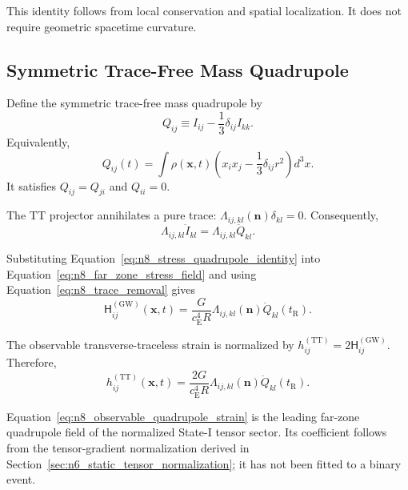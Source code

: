 This identity follows from local conservation and spatial localization. It does not require geometric spacetime curvature.

\subsection{Symmetric Trace-Free Mass Quadrupole}
\label{subsec:n8_stf_quadrupole}

Define the symmetric trace-free mass quadrupole by
\begin{equation}
    Q_{ij} \equiv I_{ij} - \frac{1}{3} \delta_{ij}I_{kk}.
    \label{eq:n8_stf_quadrupole_definition}
\end{equation}
Equivalently,
\begin{equation}
    Q_{ij}(t) = \int \rho(\mathbf{x},t) \left( x_{i}x_{j} - \frac{1}{3} \delta_{ij}r^{2} \right) d^{3}x.
    \label{eq:n8_quadrupole_integral}
\end{equation}
It satisfies $Q_{ij} = Q_{ji}$ and $Q_{ii} = 0$.

The TT projector annihilates a pure trace: $\Lambda_{ij,kl}(\mathbf{n}) \delta_{kl} = 0$. Consequently,
\begin{equation}
    \Lambda_{ij,kl} \ddot{I}_{kl} = \Lambda_{ij,kl} \ddot{Q}_{kl}.
    \label{eq:n8_trace_removal}
\end{equation}

Substituting Equation~\eqref{eq:n8_stress_quadrupole_identity} into Equation~\eqref{eq:n8_far_zone_stress_field} and using Equation~\eqref{eq:n8_trace_removal} gives
\begin{equation}
    \mathsf{H}_{ij}^{(\mathrm{GW})} (\mathbf{x},t) = \frac{G}{ c_{\mathrm{E}}^{4}R } \Lambda_{ij,kl}(\mathbf{n}) \ddot{Q}_{kl} \left( t_{\mathrm{R}} \right).
    \label{eq:n8_H_quadrupole_field}
\end{equation}

The observable transverse-traceless strain is normalized by $h_{ij}^{(\mathrm{TT})} = 2\mathsf{H}_{ij}^{(\mathrm{GW})}$. Therefore,
\begin{equation}
    h_{ij}^{(\mathrm{TT})} (\mathbf{x},t) = \frac{2G}{ c_{\mathrm{E}}^{4}R } \Lambda_{ij,kl}(\mathbf{n}) \ddot{Q}_{kl} \left( t_{\mathrm{R}} \right).
    \label{eq:n8_observable_quadrupole_strain}
\end{equation}

Equation~\eqref{eq:n8_observable_quadrupole_strain} is the leading far-zone quadrupole field of the normalized State-I tensor sector. Its coefficient follows from the tensor-gradient normalization derived in Section~\ref{sec:n6_static_tensor_normalization}; it has not been fitted to a binary event.

